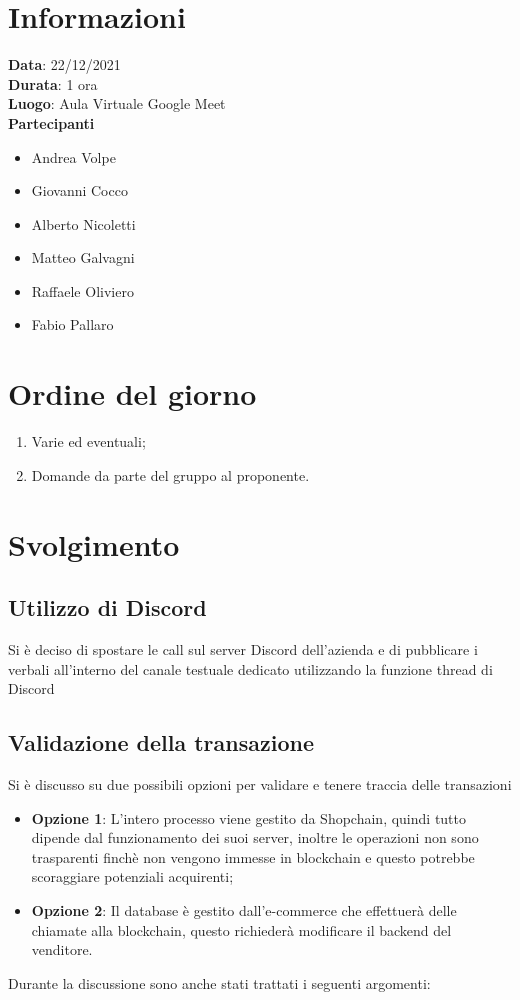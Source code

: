 \documentclass[a4paper, 12pt]{article}
\begin{document}
\makefrontpage

\section{Informazioni}
\textbf{Data}: 22/12/2021\\
\textbf{Durata}: 1 ora\\
\textbf{Luogo}: Aula Virtuale Google Meet\\

\textbf{Partecipanti}
\begin{itemize}
	\item Andrea Volpe
	\item Giovanni Cocco
	\item Alberto Nicoletti
	\item Matteo Galvagni
	\item Raffaele Oliviero
	\item Fabio Pallaro
\end{itemize}

\section{Ordine del giorno}
\begin{enumerate}
	\item Varie ed eventuali;
	\item Domande da parte del gruppo al proponente.
\end{enumerate}


\section{Svolgimento}
\subsection{Utilizzo di Discord}
Si è deciso di spostare le call sul server Discord dell'azienda e di pubblicare i verbali all'interno del canale testuale dedicato utilizzando la funzione thread di Discord

\subsection{Validazione della transazione}
Si è discusso su due possibili opzioni per validare e tenere traccia delle transazioni
	\begin{itemize}
		\item \textbf{Opzione 1}: L'intero processo viene gestito da Shopchain, quindi tutto dipende dal funzionamento dei suoi server, inoltre le operazioni non sono trasparenti finchè non vengono immesse in blockchain e questo potrebbe scoraggiare potenziali acquirenti;
		\item \textbf{Opzione 2}: Il database è gestito dall'e-commerce che effettuerà delle chiamate alla blockchain, questo richiederà modificare il backend del venditore.
	\end{itemize}
Durante la discussione sono anche stati trattati i seguenti argomenti: 
\end{document}
